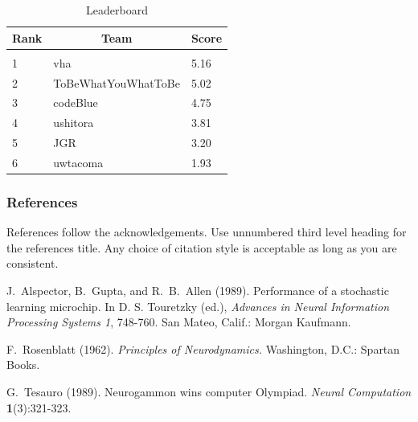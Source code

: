 \documentclass[letterpaper]{article}
\begin{document}
\begin{table}[h]
\caption{Leaderboard}
\label{sample-table}
\begin{center}
\begin{tabular}{lll}
\multicolumn{1}{c}{\bf Rank}  &\multicolumn{1}{c}{\bf Team} &\multicolumn{1}{c}{\bf Score}\\
\hline \\
1	&vha						&5.16\\
2	&ToBeWhatYouWhatToBe		&5.02\\
3	&codeBlue					&4.75\\
4	&ushitora					&3.81\\
5	&JGR						&3.20\\
6	&uwtacoma					&1.93\\
\end{tabular}
\end{center}
\end{table}

\newpage


\subsubsection*{References}

References follow the acknowledgements.  Use unnumbered third level
heading for the references title.  Any choice of citation style is
acceptable as long as you are consistent.


J.~Alspector, B.~Gupta, and R.~B.~Allen  (1989). Performance of a
stochastic learning microchip.  In D. S. Touretzky (ed.), {\it Advances
in Neural Information Processing Systems 1}, 748-760.  San Mateo, Calif.:
Morgan Kaufmann.

F.~Rosenblatt (1962). {\it Principles of Neurodynamics.} Washington,
D.C.: Spartan Books.

G.~Tesauro (1989). Neurogammon wins computer Olympiad.  {\it Neural
Computation} {\bf 1}(3):321-323.
\end{document}
